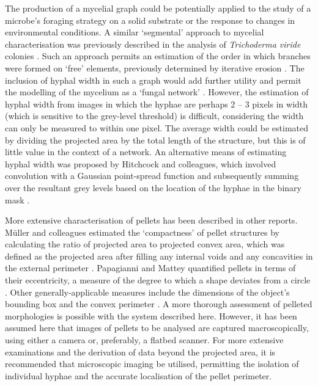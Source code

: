 The production of a mycelial graph could be potentially applied to the study of a microbe's foraging strategy on a solid substrate or the response to changes in environmental conditions. A similar \lq segmental' approach to mycelial characterisation was previously described in the analysis of \emph{Trichoderma viride} colonies \cite{hitchcock1996}. Such an approach permits an estimation of the order in which branches were formed on \lq free' elements, previously determined by iterative erosion \cite{tucker1992,spohr1998,lecault2007}. The inclusion of hyphal width in such a graph would add further utility and permit the modelling of the mycelium as a \lq fungal network' \cite{fricker2008}. However, the estimation of hyphal width from images in which the hyphae are perhaps 2 -- 3 pixels in width (which is sensitive to the grey-level threshold) is difficult, considering the width can only be measured to within one pixel. The average width could be estimated by dividing the projected area by the total length of the structure, but this is of little value in the context of a network. An alternative means of estimating hyphal width was proposed by Hitchcock and colleagues, which involved convolution with a Gaussian point-spread function and subsequently summing over the resultant grey levels based on the location of the hyphae in the binary mask \cite{hitchcock1996}.

More extensive characterisation of pellets has been described in other reports. M\"{u}ller and colleagues estimated the \lq compactness' of pellet structures by calculating the ratio of projected area to projected convex area, which was defined as the projected area after filling any internal voids and any concavities in the external perimeter \cite{muller2003}. Papagianni and Mattey quantified pellets in terms of their eccentricity, a measure of the degree to which a shape deviates from a circle \cite{papagianni2006a}. Other generally-applicable measures include the dimensions of the object's bounding box and the convex perimeter \cite{lecault2007}. A more thorough assessment of pelleted morphologies is possible with the system described here. However, it has been assumed here that images of pellets to be analysed are captured macroscopically, using either a camera or, preferably, a flatbed scanner. For more extensive examinations and the derivation of data beyond the projected area, it is recommended that microscopic imaging be utilised, permitting the isolation of individual hyphae and the accurate localisation of the pellet perimeter.

